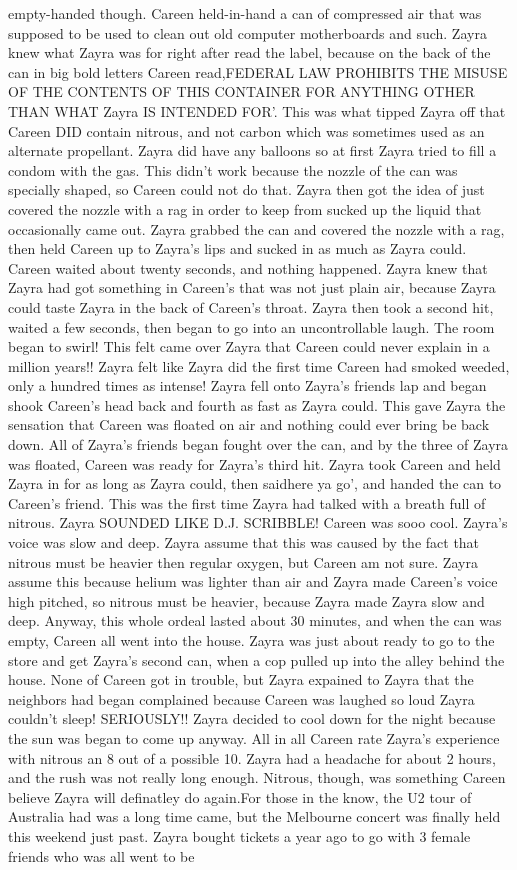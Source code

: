 \documentclass[12pt]{book}
\begin{document}
empty-handed though. Careen held-in-hand a can of compressed air that was supposed to be used to clean out old computer motherboards and such. Zayra knew what Zayra was for right after read the label, because on the back of the can in big bold letters Careen read,FEDERAL LAW PROHIBITS THE MISUSE OF THE CONTENTS OF THIS CONTAINER FOR ANYTHING OTHER THAN WHAT Zayra IS INTENDED FOR'. This was what tipped Zayra off that Careen DID contain nitrous, and not carbon which was sometimes used as an alternate propellant. Zayra did have any balloons so at first Zayra tried to fill a condom with the gas. This didn't work because the nozzle of the can was specially shaped, so Careen could not do that. Zayra then got the idea of just covered the nozzle with a rag in order to keep from sucked up the liquid that occasionally came out. Zayra grabbed the can and covered the nozzle with a rag, then held Careen up to Zayra's lips and sucked in as much as Zayra could. Careen waited about twenty seconds, and nothing happened. Zayra knew that Zayra had got something in Careen's that was not just plain air, because Zayra could taste Zayra in the back of Careen's throat. Zayra then took a second hit, waited a few seconds, then began to go into an uncontrollable laugh. The room began to swirl! This felt came over Zayra that Careen could never explain in a million years!! Zayra felt like Zayra did the first time Careen had smoked weeded, only a hundred times as intense! Zayra fell onto Zayra's friends lap and began shook Careen's head back and fourth as fast as Zayra could. This gave Zayra the sensation that Careen was floated on air and nothing could ever bring be back down. All of Zayra's friends began fought over the can, and by the three of Zayra was floated, Careen was ready for Zayra's third hit. Zayra took Careen and held Zayra in for as long as Zayra could, then saidhere ya go', and handed the can to Careen's friend. This was the first time Zayra had talked with a breath full of nitrous. Zayra SOUNDED LIKE D.J. SCRIBBLE! Careen was sooo cool. Zayra's voice was slow and deep. Zayra assume that this was caused by the fact that nitrous must be heavier then regular oxygen, but Careen am not sure. Zayra assume this because helium was lighter than air and Zayra made Careen's voice high pitched, so nitrous must be heavier, because Zayra made Zayra slow and deep. Anyway, this whole ordeal lasted about 30 minutes, and when the can was empty, Careen all went into the house. Zayra was just about ready to go to the store and get Zayra's second can, when a cop pulled up into the alley behind the house. None of Careen got in trouble, but Zayra expained to Zayra that the neighbors had began complained because Careen was laughed so loud Zayra couldn't sleep! SERIOUSLY!! Zayra decided to cool down for the night because the sun was began to come up anyway. All in all Careen rate Zayra's experience with nitrous an 8 out of a possible 10. Zayra had a headache for about 2 hours, and the rush was not really long enough. Nitrous, though, was something Careen believe Zayra will definatley do again.For those in the know, the U2 tour of Australia had was a long time came, but the Melbourne concert was finally held this weekend just past. Zayra bought tickets a year ago to go with 3 female friends who was all went to be 
\end{document}

